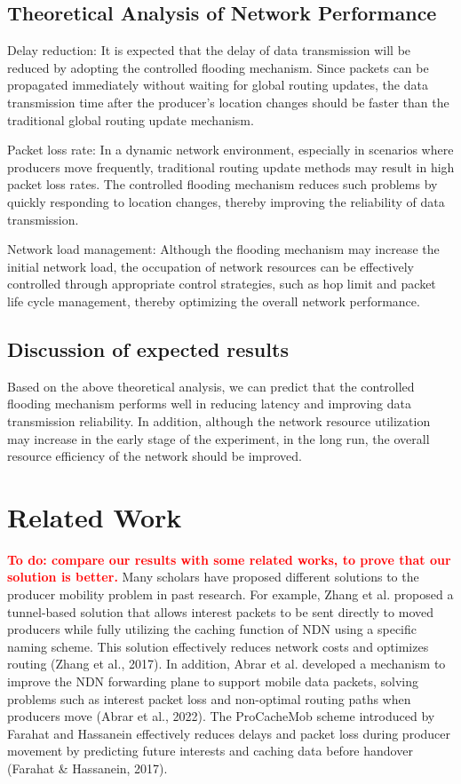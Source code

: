 \documentclass[conference]{IEEEtran}
\newcommand{\todo}[1]{\textbf{\textcolor{red}{To do: #1}}}
\begin{document}
\subsection{Theoretical Analysis of Network Performance}
Delay reduction: It is expected that the delay of data transmission will be reduced by adopting the controlled flooding mechanism. Since packets can be propagated immediately without waiting for global routing updates, the data transmission time after the producer's location changes should be faster than the traditional global routing update mechanism.

Packet loss rate: In a dynamic network environment, especially in scenarios where producers move frequently, traditional routing update methods may result in high packet loss rates. The controlled flooding mechanism reduces such problems by quickly responding to location changes, thereby improving the reliability of data transmission.

Network load management: Although the flooding mechanism may increase the initial network load, the occupation of network resources can be effectively controlled through appropriate control strategies, such as hop limit and packet life cycle management, thereby optimizing the overall network performance.

\subsection{Discussion of expected results}
Based on the above theoretical analysis, we can predict that the controlled flooding mechanism performs well in reducing latency and improving data transmission reliability. In addition, although the network resource utilization may increase in the early stage of the experiment, in the long run, the overall resource efficiency of the network should be improved.

\section{Related Work}
\todo{compare our results with some related works, to prove that our solution is better.}
Many scholars have proposed different solutions to the producer mobility problem in past research. For example, Zhang et al. proposed a tunnel-based solution that allows interest packets to be sent directly to moved producers while fully utilizing the caching function of NDN using a specific naming scheme. This solution effectively reduces network costs and optimizes routing (Zhang et al., 2017). In addition, Abrar et al. developed a mechanism to improve the NDN forwarding plane to support mobile data packets, solving problems such as interest packet loss and non-optimal routing paths when producers move (Abrar et al., 2022). The ProCacheMob scheme introduced by Farahat and Hassanein effectively reduces delays and packet loss during producer movement by predicting future interests and caching data before handover (Farahat \& Hassanein, 2017).
\end{document}
